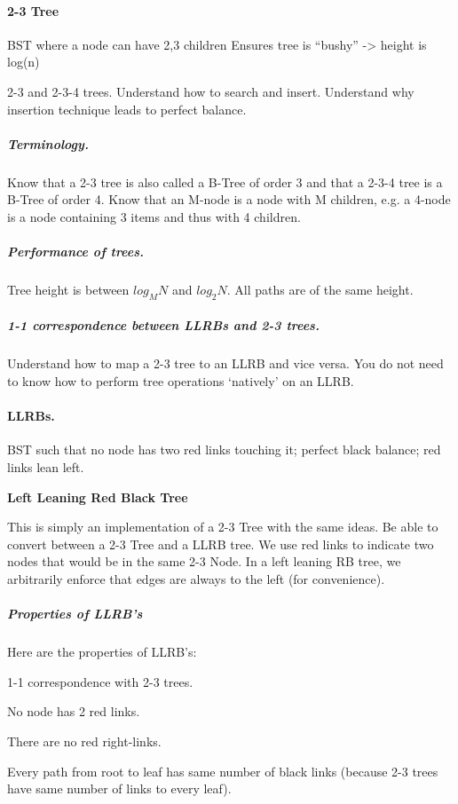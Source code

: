 \documentclass[UTF8]{ctexart}
\begin{document}
\paragraph{2-3 Tree}

BST where a node can have 2,3 children
Ensures tree is “bushy” -> height is log(n)


2-3 and 2-3-4 trees. Understand how to search and insert. 
Understand why insertion technique leads to perfect balance.

\subparagraph{Terminology. }

Know that a 2-3 tree is also called a B-Tree of order 3 
and that a 2-3-4 tree is a B-Tree of order 4. 
Know that an M-node is a node with M children, 
e.g. a 4-node is a node containing 3 items and thus with 4 children.


\subparagraph{Performance of trees. }

Tree height is between $log_M N$ and $log_2 N$. 
All paths are of the same height.


\subparagraph{1-1 correspondence between LLRBs and 2-3 trees. }

Understand how to map a 2-3 tree to an LLRB and vice versa. 
You do not need to know how to perform tree operations ‘natively’ on an LLRB.

\paragraph{LLRBs. }

BST such that no node has two red links touching it; perfect black balance; red links lean left.


\textbf{Left Leaning Red Black Tree}


 This is simply an implementation of a 2-3 Tree with the same ideas. 
 Be able to convert between a 2-3 Tree and a LLRB tree. 
 We use red links to indicate two nodes that would be in the same 2-3 Node. 
 In a left leaning RB tree, we arbitrarily enforce that edges are always to the left (for convenience).


\subparagraph{Properties of LLRB's}

Here are the properties of LLRB's:

1-1 correspondence with 2-3 trees.

No node has 2 red links.

There are no red right-links.

Every path from root to leaf has same number of black links (because 2-3 trees have same number of links to every leaf).
\end{document}
